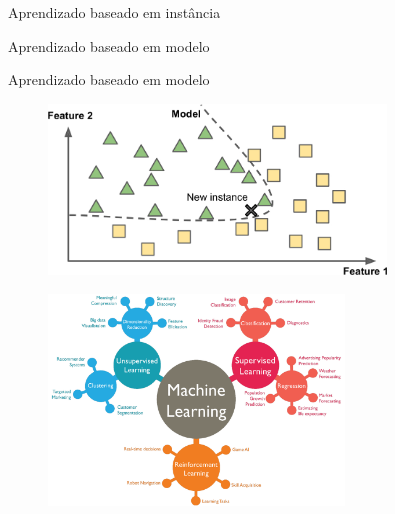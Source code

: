 \documentclass[12pt,mathserif,aspectratio=169]{beamer}
\begin{document}
\begin{frame}{Aprendizado baseado em instância}
\end{frame}

\begin{frame}
	\Huge Aprendizado baseado em modelo
\end{frame}

\begin{frame}{Aprendizado baseado em modelo}
    \begin{figure}
		\includegraphics[width=0.8\textwidth]{fig/fig1_16.jpg}
	\end{figure}
\end{frame}

\begin{frame}
    \begin{figure}
        \includegraphics[width=0.7\textwidth]{fig/ml.pdf}
    \end{figure}
\end{frame}
\end{document}
